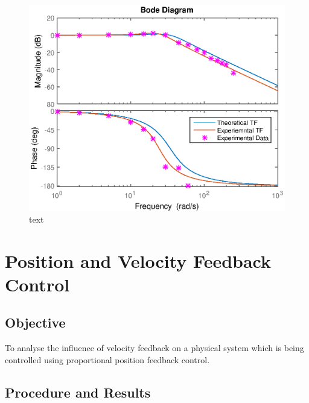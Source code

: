 \documentclass{article}
\begin{document}
\begin{figure}[H]
	\centering
	\includegraphics[scale=0.7]{fig10}
	\caption{text}
\end{figure}



\section{Position and Velocity Feedback Control}


\subsection{Objective}

To analyse the influence of velocity feedback on a physical system which is being controlled using proportional position feedback control.


\subsection{Procedure and Results}
\end{document}

